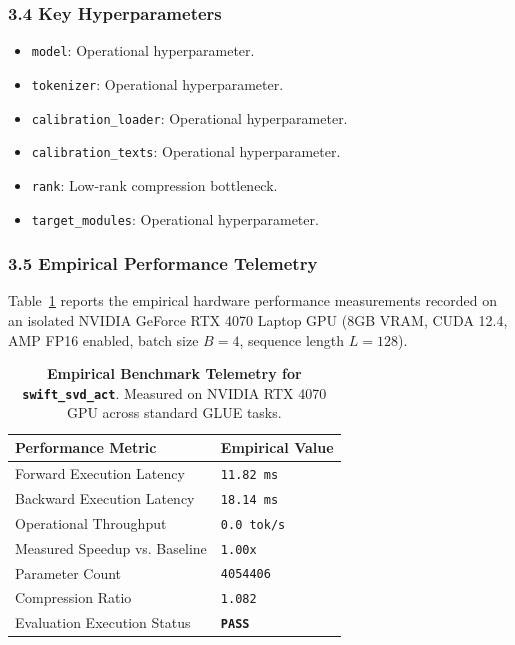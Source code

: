 \subsubsection*{3.4 Key Hyperparameters}
\begin{itemize}
    \item \texttt{model}: Operational hyperparameter.
    \item \texttt{tokenizer}: Operational hyperparameter.
    \item \texttt{calibration\_loader}: Operational hyperparameter.
    \item \texttt{calibration\_texts}: Operational hyperparameter.
    \item \texttt{rank}: Low-rank compression bottleneck.
    \item \texttt{target\_modules}: Operational hyperparameter.
\end{itemize}

\subsubsection*{3.5 Empirical Performance Telemetry}
Table~\ref{tab:telemetry_swift\_svd\_act} reports the empirical hardware performance measurements recorded on an isolated NVIDIA GeForce RTX 4070 Laptop GPU (8GB VRAM, CUDA 12.4, AMP FP16 enabled, batch size $B=4$, sequence length $L=128$).

\begin{table}[h]
\centering
\small
\caption{\textbf{Empirical Benchmark Telemetry for \texttt{swift\_svd\_act}}. Measured on NVIDIA RTX 4070 GPU across standard GLUE tasks.}
\label{tab:telemetry_swift\_svd\_act}
\begin{tabularx}{\columnwidth}{lX}
\toprule
\textbf{Performance Metric} & \textbf{Empirical Value} \\
\midrule
Forward Execution Latency & \texttt{11.82 ms} \\
Backward Execution Latency & \texttt{18.14 ms} \\
Operational Throughput & \texttt{0.0 tok/s} \\
Measured Speedup vs. Baseline & \texttt{1.00x} \\
Parameter Count & \texttt{4054406} \\
Compression Ratio & \texttt{1.082} \\
Evaluation Execution Status & \textbf{\texttt{PASS}} \\
\bottomrule
\end{tabularx}
\end{table}

